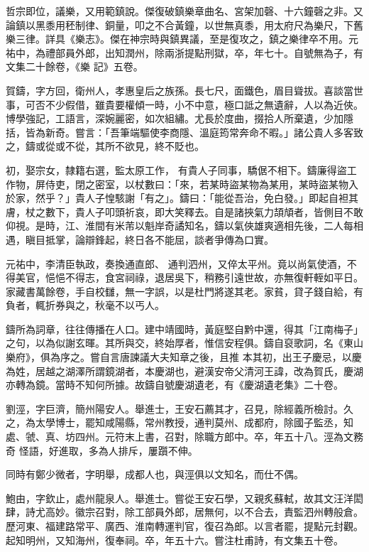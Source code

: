 \begin{pinyinscope}
 哲宗即位，議樂，又用範鎮說。傑復破鎮樂章曲名、宮架加磬、十六鐘磬之非。又論鎮以黑黍用秠制律、銅量，叩之不合黃鐘，以世無真黍，用太府尺為樂尺，下舊樂三律。詳具《樂志》。傑在神宗時與鎮異議，至是復攻之，鎮之樂律卒不用。元祐中，為禮部員外郎，出知潤州，除兩浙提點刑獄，卒，年七十。自號無為子，有文集二十餘卷，《樂
 記》五卷。



 賀鑄，字方回，衛州人，孝惠皇后之族孫。長七尺，面鐵色，眉目聳拔。喜談當世事，可否不少假借，雖貴要權傾一時，小不中意，極口詆之無遺辭，人以為近俠。博學強記，工語言，深婉麗密，如次組繡。尤長於度曲，掇拾人所棄遺，少加隱括，皆為新奇。嘗言：「吾筆端驅使李商隱、溫庭筠常奔命不暇。」諸公貴人多客致之，鑄或從或不從，其所不欲見，終不貶也。



 初，娶宗女，隸籍右選，監太原工作，
 有貴人子同事，驕倨不相下。鑄廉得盜工作物，屏侍吏，閉之密室，以杖數曰：「來，若某時盜某物為某用，某時盜某物入於家，然乎？」貴人子惶駭謝「有之」。鑄曰：「能從吾治，免白發。」即起自袒其膚，杖之數下，貴人子叩頭祈哀，即大笑釋去。自是諸挾氣力頡頏者，皆側目不敢仰視。是時，江、淮間有米芾以魁岸奇譎知名，鑄以氣俠雄爽適相先後，二人每相遇，瞋目抵掌，論辯鋒起，終日各不能屈，談者爭傳為口實。



 元祐中，李清臣執政，奏換通直郎、
 通判泗州，又倅太平州。竟以尚氣使酒，不得美官，悒悒不得志，食宮祠祿，退居吳下，稍務引遠世故，亦無復軒輊如平日。家藏書萬餘卷，手自校讎，無一字誤，以是杜門將遂其老。家貧，貸子錢自給，有負者，輒折券與之，秋毫不以丐人。



 鑄所為詞章，往往傳播在人口。建中靖國時，黃庭堅自黔中還，得其「江南梅子」之句，以為似謝玄暉。其所與交，終始厚者，惟信安程俱。鑄自裒歌詞，名《東山樂府》，俱為序之。嘗自言唐諫議大夫知章之後，且推
 本其初，出王子慶忌，以慶為姓，居越之湖澤所謂鏡湖者，本慶湖也，避漢安帝父清河王諱，改為賀氏，慶湖亦轉為鏡。當時不知何所據。故鑄自號慶湖遺老，有《慶湖遺老集》二十卷。



 劉涇，字巨濟，簡州陽安人。舉進士，王安石薦其才，召見，除經義所檢討。久之，為太學博士，罷知咸陽縣，常州教授，通判莫州、成都府，除國子監丞，知處、虢、真、坊四州。元符末上書，召對，除職方郎中。卒，年五十八。涇為文務奇
 怪語，好進取，多為人排斥，屢躓不伸。



 同時有鄭少微者，字明舉，成都人也，與涇俱以文知名，而仕不偶。



 鮑由，字欽止，處州龍泉人。舉進士。嘗從王安石學，又親炙蘇軾，故其文汪洋閎肆，詩尤高妙。徽宗召對，除工部員外郎，居無何，以不合去，責監泗州轉般倉。歷河東、福建路常平、廣西、淮南轉運判官，復召為郎。以言者罷，提點元封觀。起知明州，又知海州，復奉祠。卒，年五十六。嘗注杜甫詩，有文集五十卷。




\end{pinyinscope}
